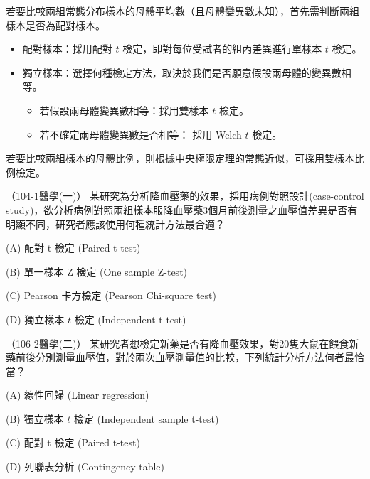     \answerbox{300pt}
    
    \bigskip 

    \begin{takehome}
        \item 若要比較兩組常態分布樣本的母體平均數（且母體變異數未知），首先需判斷兩組樣本是否為配對樣本。
        \begin{itemize}
            \item 配對樣本：採用配對 $t$ 檢定，即對每位受試者的組內差異進行單樣本 $t$ 檢定。
            \item 獨立樣本：選擇何種檢定方法，取決於我們是否願意假設兩母體的變異數相等。
            \begin{itemize}
                \item 若假設兩母體變異數相等：採用雙樣本 $t$ 檢定。
                \item 若不確定兩母體變異數是否相等：
採用 Welch $t$ 檢定。
            \end{itemize}
        \end{itemize}
        \item 若要比較兩組樣本的母體比例，則根據中央極限定理的常態近似，可採用雙樣本比例檢定。
    \end{takehome}

    \bigskip
    
    \begin{docexam}{（104-1醫學(一)）}
        某研究為分析降血壓藥的效果，採用病例對照設計(case-control study)，欲分析病例對照兩組樣本服降血壓藥3個月前後測量之血壓值差異是否有明顯不同，研究者應該使用何種統計方法最合適？

        (A) 配對 t 檢定 (Paired t-test)

        (B) 單一樣本 Z 檢定 (One sample Z-test)

        (C) Pearson 卡方檢定 (Pearson Chi-square test)

        (D) 獨立樣本 $t$ 檢定 (Independent t-test)
    \end{docexam}
    
    \begin{docexam}{（106-2醫學(二)）}
        某研究者想檢定新藥是否有降血壓效果，對20隻大鼠在餵食新藥前後分別測量血壓值，對於兩次血壓測量值的比較，下列統計分析方法何者最恰當？

        (A) 線性回歸 (Linear regression)

        (B) 獨立樣本 $t$ 檢定 (Independent sample t-test)

        (C) 配對 t 檢定 (Paired t-test)

        (D) 列聯表分析 (Contingency table)
    \end{docexam}
    
